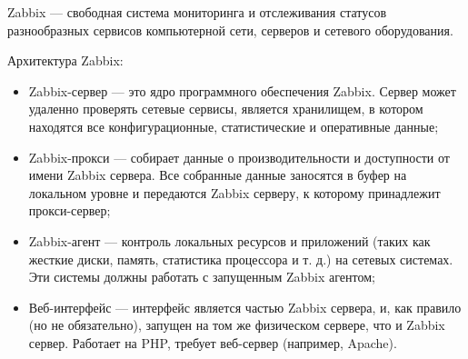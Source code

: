 
Zabbix ---  свободная система мониторинга и отслеживания статусов разнообразных сервисов компьютерной сети, серверов и сетевого оборудования. 

Архитектура Zabbix:
\begin{itemize}
\item Zabbix-сервер — это ядро программного обеспечения Zabbix. Сервер может удаленно проверять сетевые сервисы, является хранилищем, в котором находятся все конфигурационные, статистические и оперативные данные;
\item Zabbix-прокси — собирает данные о производительности и доступности от имени Zabbix сервера. Все собранные данные заносятся в буфер на локальном уровне и передаются Zabbix серверу, к которому принадлежит прокси-сервер;
\item Zabbix-агент — контроль локальных ресурсов и приложений (таких как жесткие диски, память, статистика процессора и т. д.) на сетевых системах. Эти системы должны работать с запущенным Zabbix агентом;
\item Веб-интерфейс — интерфейс является частью Zabbix сервера, и, как правило (но не обязательно), запущен на том же физическом сервере, что и Zabbix сервер. Работает на PHP, требует веб-сервер (например, Apache).
\end{itemize}